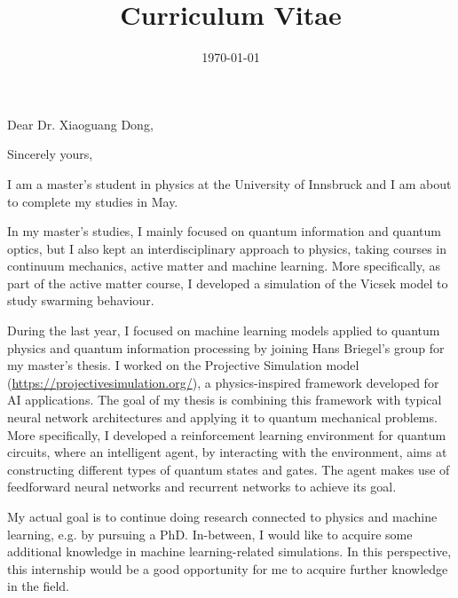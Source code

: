 \documentclass[11pt,a4paper,sans]{moderncv} %
\title{Curriculum Vitae}
\begin{document}


\clearpage

\date{\today} %
\opening{Dear Dr. Xiaoguang Dong,} %
\closing{Sincerely yours,} %

\makelettertitle %

\justify
I am a master's student in physics at the University of Innsbruck and I am about to complete my studies in May. 

In my master’s studies, I mainly focused on quantum information and quantum optics, but I also kept an interdisciplinary approach to physics, taking courses in continuum mechanics, active matter and machine learning. More specifically, as part of the active matter course, I developed a simulation of the Vicsek model to study swarming behaviour.

During the last year, I focused on machine learning models applied to quantum physics and quantum information processing by joining Hans Briegel’s group for my master’s thesis. I worked on the Projective Simulation model (\url{https://projectivesimulation.org/}), a physics-inspired framework developed for AI applications. The goal of my thesis is combining this framework with typical neural network architectures and applying it to quantum mechanical problems. More specifically, I developed a reinforcement learning environment for quantum circuits, where an intelligent agent, by interacting with the environment, aims at constructing different types of quantum states and gates. The agent makes use of feedforward neural networks and recurrent networks to achieve its goal. 

My actual goal is to continue doing research connected to physics and machine learning, e.g. by pursuing a PhD. In-between, I would like to acquire some additional knowledge in machine learning-related simulations. In this perspective, this internship would be a good opportunity for me to acquire further knowledge in the field.
 
\end{document}
